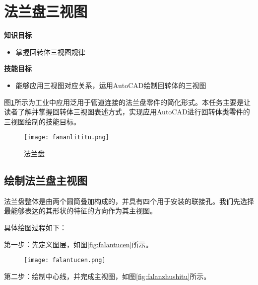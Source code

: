 \section{法兰盘三视图}

{\bfseries 知识目标}
\begin{itemize}
\item 掌握回转体三视图规律
\end{itemize}

{\bfseries 技能目标}
\begin{itemize}
\item 能够应用三视图对应关系，运用AutoCAD绘制回转体的三视图
\end{itemize}

图\ref{fig:falanpanlititu}所示为工业中应用泛用于管道连接的法兰盘零件的简化形式。本任务主要是让读者了解并掌握回转体三视图表述方式，实现应用AutoCAD进行回转体类零件的三视图绘制的技能目标。
\begin{figure}[htbp]
\centering
\texttt{[image: fananlititu.png]}
\caption{法兰盘}\label{fig:falanpanlititu}
\end{figure}
\subsection{绘制法兰盘主视图}
法兰盘整体是由两个圆筒叠加构成的，并具有四个用于安装的联接孔。我们先选择最能够表达的其形状的特征的方向作为其主视图。

具体绘图过程如下：

第一步：先定义图层，如图\ref{fig:falantucen}所示。
\begin{figure}[htbp]
\centering
\begin{floatrow}
{\texttt{[image: falantucen.png]}}
\end{floatrow}
\end{figure}

第二步：绘制中心线，并完成主视图，如图\ref{fig:falanzhushitu}所示。

